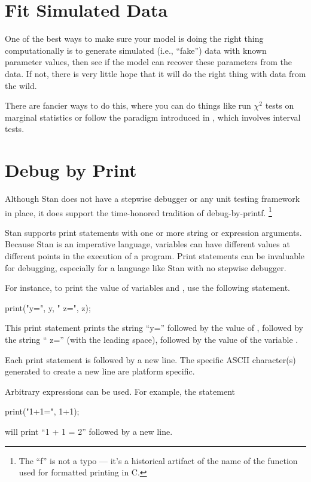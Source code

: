 \section{Fit Simulated Data}

One of the best ways to make sure your model is doing the right thing
computationally is to generate simulated (i.e., ``fake'') data with
known parameter values, then see if the model can recover these
parameters from the data.  If not, there is very little hope that it
will do the right thing with data from the wild.  

There are fancier ways to do this, where you can do things like run
$\chi^2$ tests on marginal statistics or follow the paradigm
introduced in \citep{CookGelmanRubin:2006}, which involves interval
tests.  

\section{Debug by Print}

Although Stan does not have a stepwise debugger or any unit testing
framework in place, it does support the time-honored tradition of
debug-by-printf.%
%
\footnote{The ``f'' is not a typo --- it's a historical artifact of
  the name of the  function used for formatted printing
  in C.} 

Stan supports print statements with one or more string or expression
arguments.  Because Stan is an imperative language, variables can have
different values at different points in the execution of a program.
Print statements can be invaluable for debugging, especially for a
language like Stan with no stepwise debugger.

For instance, to print the value of variables  and
, use the following statement.
%
\begin{stancode}
print("y=", y, " z=", z);
\end{stancode}
%
This print statement prints the string ``y='' followed by the value of
, followed by the string `` z=''
(with the leading space), followed by the value of the variable
.

Each print statement is followed by a new line.  The specific ASCII
character(s) generated to create a new line are platform specific.

Arbitrary expressions can be used.  For example, the statement
\begin{stancode}
print("1+1=", 1+1);
\end{stancode}
%
will print ``1 + 1 = 2'' followed by a new line.

